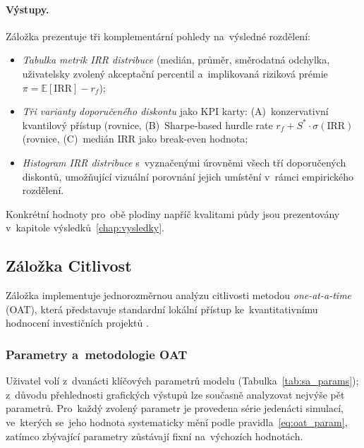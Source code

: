 \paragraph{Výstupy.}
Záložka prezentuje tři komplementární pohledy na~výsledné rozdělení:
\begin{itemize}
    \item \emph{Tabulka metrik IRR distribuce} (medián, průměr,
          směrodatná odchylka, uživatelsky zvolený akceptační percentil
          a~implikovaná riziková prémie $\pi = \mathbb{E}[\mathrm{IRR}] - r_f$);
    \item \emph{Tři varianty doporučeného diskontu} jako KPI karty:
          (A)~konzervativní kvantilový přístup
          (rovnice,
          (B)~Sharpe-based hurdle rate $r_f + S^* \cdot \sigma(\mathrm{IRR})$
          (rovnice,
          (C)~medián IRR jako break-even hodnota;
    \item \emph{Histogram IRR distribuce} s~vyznačenými úrovněmi
          všech tří doporučených diskontů, umožňující vizuální
          porovnání jejich umístění v~rámci empirického rozdělení.
\end{itemize}
Konkrétní hodnoty pro~obě plodiny napříč kvalitami půdy jsou
prezentovány v~kapitole výsledků~\ref{chap:vysledky}.
\subsection{Záložka Citlivost}
\label{sec:vystupy_citlivost}

Záložka implementuje jednorozměrnou analýzu citlivosti metodou
\textit{one-at-a-time} (OAT), která představuje standardní lokální
přístup ke~kvantitativnímu hodnocení investičních projektů
\citep{Saltelli2008}.

\subsubsection{Parametry a~metodologie OAT}
\label{sec:citlivost_oat}

Uživatel volí z~dvanácti klíčových parametrů modelu
(Tabulka~\ref{tab:sa_params}); z~důvodu přehlednosti grafických
výstupů lze současně analyzovat nejvýše pět parametrů. Pro~každý
zvolený parametr je provedena série jedenácti simulací, ve~kterých
se~jeho hodnota systematicky mění podle pravidla~\eqref{eq:oat_param},
zatímco zbývající parametry zůstávají fixní na~výchozích hodnotách.

